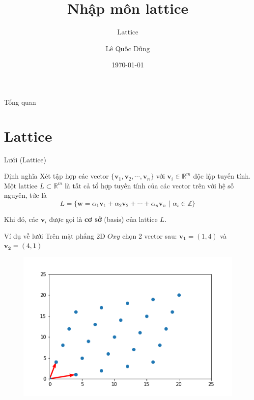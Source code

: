 \documentclass[aspectratio=169,xcolor=dvipsnames,serif]{beamer}
\title[short title]{Nhập môn lattice} %
\subtitle{Lattice}
\author{Lê Quốc Dũng}
\institute[MPEI] %
{
    Moscow Power Engineering Institute
}
\date{\today} %
\begin{document}
\begin{frame}
    \titlepage
\end{frame}

\begin{frame}{Tổng quan}
    \tableofcontents
\end{frame}




\section{Lattice}

\begin{frame}{Lưới (Lattice)}
    \begin{block}{Định nghĩa}
        Xét tập hợp các vector $\{ \bm{v}_1, \bm{v}_2, \cdots, \bm{v}_n \}$ với $\bm{v}_i \in \mathbb{R}^m$ độc lập tuyến tính. Một lattice $L \subset \mathbb{R}^m$ là tất cả tổ hợp tuyến tính của các vector trên với hệ số nguyên, tức là \[L = \{\bm{w} =  \alpha_1 \bm{v}_1 + \alpha_2 \bm{v}_2 + \cdots + \alpha_n \bm{v}_n \text{ | } \alpha_i \in \mathbb{Z} \}\]
        
        Khi đó, các $\bm{v}_i$ được gọi là \textbf{cơ sở} (basis) của lattice $L$.
    \end{block}
    
\end{frame}

\begin{frame}{Ví dụ về lưới}
    Trên mặt phẳng 2D $Oxy$ chọn 2 vector sau: $\bm{v_1} = (1, 4)$ và $\bm{v_2}=(4,1)$
    \begin{figure}
        \centering
        \includegraphics[scale=0.5]{lattice.png}
    \end{figure}
\end{frame}
\end{document}

